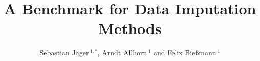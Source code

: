 \documentclass[utf8]{frontiersSCNS} %
\def\firstAuthorLast{Jäger {et~al.}} %
\def\Authors{Sebastian Jäger\,$^{1,*}$, Arndt Allhorn\,$^{1}$ and Felix Bießmann\,$^{1}$}
\begin{document}
\onecolumn
{}

\title[A Benchmark for Data Imputation Methods]{A Benchmark for Data Imputation Methods}

\author[\firstAuthorLast ]{\Authors} %
\address{} %
\correspondance{} %

\extraAuth{}%


\maketitle
















\end{document}
